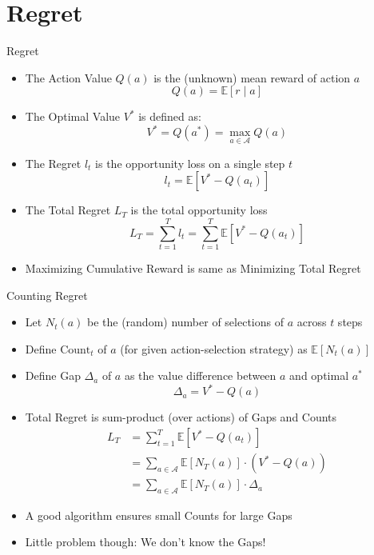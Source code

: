 \section{Regret}
\begin{frame}[shrink=10]{Regret}
\begin{itemize}
    \item The Action Value $Q(a)$ is the (unknown) mean reward of action $a$
    \[
        Q(a) = \mathbb{E}[r \mid a]
    \]
    \item The Optimal Value $V^*$ is defined as:
    \[
        V^* = Q(a^*) = \max_{a \in \mathcal{A}} Q(a)
    \]
    \item The Regret $l_t$ is the opportunity loss on a single step $t$
    \[
        l_t = \mathbb{E}[V^* - Q(a_t)]
    \]
    \item The Total Regret $L_T$ is the total opportunity loss
    \[
        L_T = \sum_{t=1}^{T} l_t = \sum_{t=1}^{T} \mathbb{E}[V^* - Q(a_t)]
    \]
    \item Maximizing Cumulative Reward is same as Minimizing Total Regret
\end{itemize}
\end{frame}

\begin{frame}[shrink=15]{Counting Regret}
\begin{itemize}
    \item Let $N_t(a)$ be the (random) number of selections of $a$ across $t$ steps
    \item Define $\text{Count}_t$ of $a$ (for given action-selection strategy) as $\mathbb{E}[N_t(a)]$
    \item Define Gap $\Delta_a$ of $a$ as the value difference between $a$ and optimal $a^*$
    \[
        \Delta_a = V^* - Q(a)
    \]
    \item Total Regret is sum-product (over actions) of Gaps and Counts
    \begin{align*}
        L_T &= \sum_{t=1}^{T} \mathbb{E}[V^* - Q(a_t)] \\
            &= \sum_{a \in \mathcal{A}} \mathbb{E}[N_T(a)] \cdot (V^* - Q(a)) \\
            &= \sum_{a \in \mathcal{A}} \mathbb{E}[N_T(a)] \cdot \Delta_a
    \end{align*}
    \item A good algorithm ensures small Counts for large Gaps
    \item Little problem though: We don't know the Gaps!
\end{itemize}
\end{frame}

